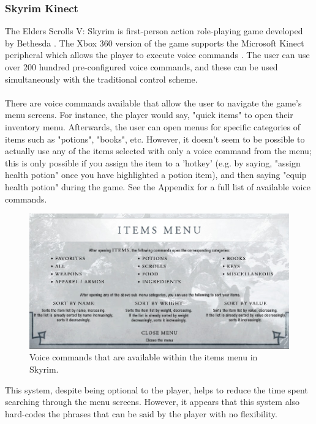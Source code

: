 \documentclass[12pt]{article}
\begin{document}
\subsubsection{Skyrim Kinect}
The Elders Scrolls V: Skyrim is first-person action role-playing game developed by Bethesda \cite{RefWorks:23}. The Xbox 360 version of the game supports the Microsoft Kinect peripheral which allows the player to execute voice commands \cite{RefWorks:24}. The user can use over 200 hundred pre-configured voice commands, and these can be used simultaneously with the traditional control scheme.
\\
\\
There are voice commands available that allow the user to navigate the game's menu screens. For instance, the player would say, "quick items" to open their inventory menu. Afterwards, the user can open menus for specific categories of items such as "potions", "books", etc. However, it doesn't seem to be possible to actually use any of the items selected with only a voice command from the menu; this is only possible if you assign the item to a 'hotkey' (e.g. by saying, "assign health potion" once you have highlighted a potion item), and then saying "equip health potion" during the game. See the Appendix for a full list of available voice commands.
\begin{center}
\begin{figure}[H]
  \includegraphics[width=\textwidth]{skyrim-item-commands.png}
  \caption{Voice commands that are available within the items menu in Skyrim.}
\end{figure}
\end{center}
This system, despite being optional to the player, helps to reduce the time spent searching through the menu screens. However, it appears that this system also hard-codes the phrases that can be said by the player with no flexibility.
\end{document}
